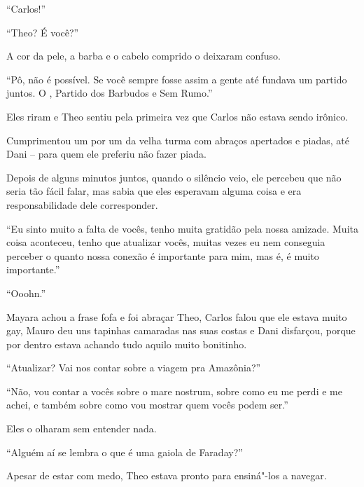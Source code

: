 ``Carlos!''

``Theo? É você?''

A cor da pele, a barba e o cabelo comprido o deixaram confuso.

``Pô, não é possível. Se você sempre fosse assim a gente até fundava um
partido juntos. O , Partido dos Barbudos e Sem Rumo.''

Eles riram e Theo sentiu pela primeira vez que Carlos não estava sendo
irônico.

Cumprimentou um por um da velha turma com abraços apertados e piadas,
até Dani -- para quem ele preferiu não fazer piada.

Depois de alguns minutos juntos, quando o silêncio veio, ele percebeu
que não seria tão fácil falar, mas sabia que eles esperavam alguma coisa
e era responsabilidade dele corresponder.

``Eu sinto muito a falta de vocês, tenho muita gratidão pela nossa
amizade. Muita coisa aconteceu, tenho que atualizar vocês, muitas vezes
eu nem conseguia perceber o quanto nossa conexão é importante para mim,
mas é, é muito importante.''

``Ooohn.''

Mayara achou a frase fofa e foi abraçar Theo, Carlos falou que ele
estava muito gay, Mauro deu uns tapinhas camaradas nas suas costas e
Dani disfarçou, porque por dentro estava achando tudo aquilo muito
bonitinho.

``Atualizar? Vai nos contar sobre a viagem pra Amazônia?''

``Não, vou contar a vocês sobre o mare nostrum, sobre como eu me perdi e
me achei, e também sobre como vou mostrar quem vocês podem ser.''

Eles o olharam sem entender nada.

``Alguém aí se lembra o que é uma gaiola de Faraday?''

Apesar de estar com medo, Theo estava pronto para ensiná"-los a navegar.

